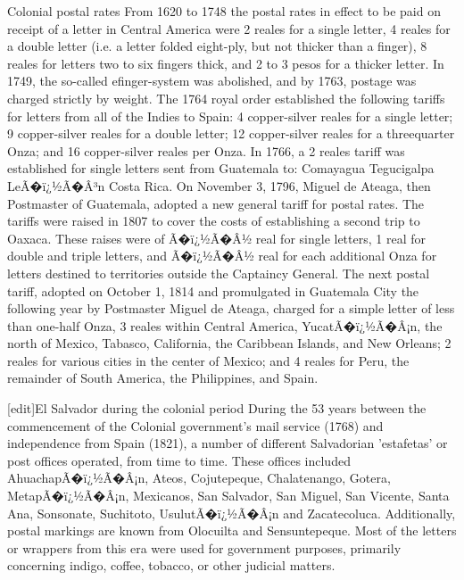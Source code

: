 Colonial postal rates
From 1620 to 1748 the postal rates in effect to be paid on receipt of a letter in Central America were 2 reales for a single letter, 4 reales for a double letter (i.e. a letter folded eight-ply, but not thicker than a finger), 8 reales for letters two to six fingers thick, and 2 to 3 pesos for a thicker letter. In 1749, the so-called efinger-system was abolished, and by 1763, postage was charged strictly by weight. The 1764 royal order established the following tariffs for letters from all of the Indies to Spain: 4 copper-silver reales for a single letter; 9 copper-silver reales for a double letter; 12 copper-silver reales for a threequarter Onza; and 16 copper-silver reales per Onza. In 1766, a 2 reales tariff was established for single letters sent from Guatemala to:
Comayagua
Tegucigalpa
LeÃ�ï¿½Ã�Â³n
Costa Rica.
On November 3, 1796, Miguel de Ateaga, then Postmaster of Guatemala, adopted a new general tariff for postal rates. The tariffs were raised in 1807 to cover the costs of establishing a second trip to Oaxaca. These raises were of Ã�ï¿½Ã�Â½ real for single letters, 1 real for double and triple letters, and Ã�ï¿½Ã�Â½ real for each additional Onza for letters destined to territories outside the Captaincy General. The next postal tariff, adopted on October 1, 1814 and promulgated in Guatemala City the following year by Postmaster Miguel de Ateaga, charged for a simple letter of less than one-half Onza, 3 reales within Central America, YucatÃ�ï¿½Ã�Â¡n, the north of Mexico, Tabasco, California, the Caribbean Islands, and New Orleans; 2 reales for various cities in the center of Mexico; and 4 reales for Peru, the remainder of South America, the Philippines, and Spain.

[edit]El Salvador during the colonial period
During the 53 years between the commencement of the Colonial government's mail service (1768) and independence from Spain (1821), a number of different Salvadorian 'estafetas' or post offices operated, from time to time. These offices included AhuachapÃ�ï¿½Ã�Â¡n, Ateos, Cojutepeque, Chalatenango, Gotera, MetapÃ�ï¿½Ã�Â¡n, Mexicanos, San Salvador, San Miguel, San Vicente, Santa Ana, Sonsonate, Suchitoto, UsulutÃ�ï¿½Ã�Â¡n and Zacatecoluca. Additionally, postal markings are known from Olocuilta and Sensuntepeque. Most of the letters or wrappers from this era were used for government purposes, primarily concerning indigo, coffee, tobacco, or other judicial matters.

